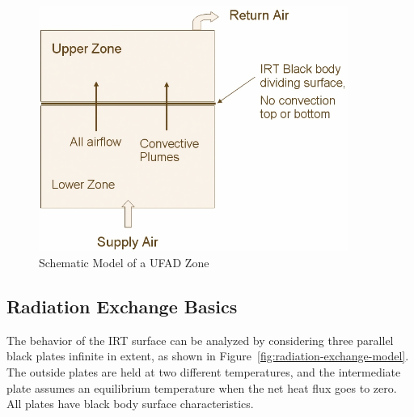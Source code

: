 \begin{figure}[hbtp] %
\centering
\includegraphics[width=0.9\textwidth, height=0.9\textheight, keepaspectratio=true]{media/image391.png}
\caption{Schematic Model of a UFAD Zone \protect \label{fig:schematic-model-of-a-ufad-zone}}
\end{figure}

\subsection{Radiation Exchange Basics}\label{radiation-exchange-basics}

The behavior of the IRT surface can be analyzed by considering three parallel black plates infinite in extent, as shown in Figure~\ref{fig:radiation-exchange-model}. The outside plates are held at two different temperatures, and the intermediate plate assumes an equilibrium temperature when the net heat flux goes to zero. All plates have black body surface characteristics.

